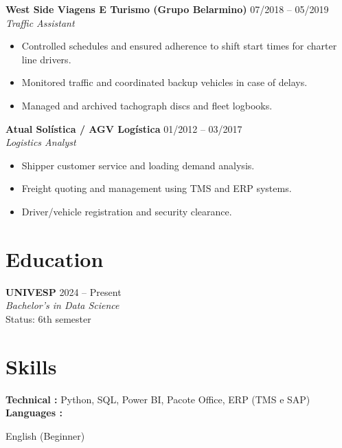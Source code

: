 \documentclass[11pt,a4paper]{article}
\begin{document}
    \noindent \textbf{ West Side Viagens E Turismo (Grupo Belarmino) } \hfill 07/2018 -- 05/2019 \\
    \textit{ Traffic Assistant }
    \begin{itemize}
        
        
            \item Controlled schedules and ensured adherence to shift start times for charter line drivers.
        
            \item Monitored traffic and coordinated backup vehicles in case of delays.
        
            \item Managed and archived tachograph discs and fleet logbooks.
        
    \end{itemize}
    \vspace{2mm}

    \noindent \textbf{ Atual Solística / AGV Logística } \hfill 01/2012 -- 03/2017 \\
    \textit{ Logistics Analyst }
    \begin{itemize}
        
        
            \item Shipper customer service and loading demand analysis.
        
            \item Freight quoting and management using TMS and ERP systems.
        
            \item Driver/vehicle registration and security clearance.
        
    \end{itemize}
    \vspace{2mm}


\section*{ Education }

    \noindent \textbf{ UNIVESP } \hfill 2024 -- Present \\
    \textit{ Bachelor's in Data Science } \\
    Status: 6th semester
    \vspace{2mm}


\section*{ Skills }
\noindent \textbf{ Technical : } Python, SQL, Power BI, Pacote Office, ERP (TMS e SAP) \\
\textbf{ Languages : } 

    English (Beginner)
\end{document}
